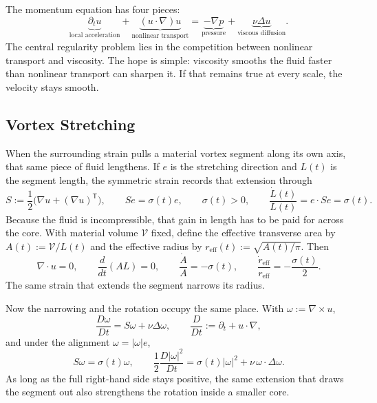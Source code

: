 
The momentum equation has four pieces:
\[
  \underbrace{\partial_t u}_{\text{local acceleration}}
  +
  \underbrace{(u\cdot\nabla)u}_{\text{nonlinear transport}}
  =
  \underbrace{-\nabla p}_{\text{pressure}}
  +
  \underbrace{\nu\Delta u}_{\text{viscous diffusion}}.
\]
The central regularity problem lies in the competition between nonlinear transport and viscosity.
The hope is simple: viscosity smooths the fluid faster than nonlinear transport can sharpen it.
If that remains true at every scale, the velocity stays smooth.

\subsection{Vortex Stretching}\label{sub:ThePerfectlyStretchingVortex}

When the surrounding strain pulls a material vortex segment along its own axis, that same piece of fluid lengthens. If \(e\) is the stretching direction and \(L(t)\) is the segment length, the symmetric strain records that extension through
\[
  S:=\frac12\bigl(\nabla u+(\nabla u)^{\mathsf T}\bigr),
  \qquad
  Se=\sigma(t)e,
  \qquad
  \sigma(t)>0,
  \qquad
  \frac{\dot L(t)}{L(t)}
  =
  e\cdot Se
  =
  \sigma(t).
\]
Because the fluid is incompressible, that gain in length has to be paid for across the core. With material volume \(\mathcal V\) fixed, define the effective transverse area by \(A(t):=\mathcal V/L(t)\) and the effective radius by \(r_{\mathrm{eff}}(t):=\sqrt{A(t)/\pi}\). Then
\[
  \nabla\cdot u=0,
  \qquad
  \frac{d}{dt}(A L)=0,
  \qquad
  \frac{\dot A}{A}=-\sigma(t),
  \qquad
  \frac{\dot r_{\mathrm{eff}}}{r_{\mathrm{eff}}}
  =
  -\frac{\sigma(t)}{2}.
\]
The same strain that extends the segment narrows its radius.

Now the narrowing and the rotation occupy the same place. With \(\omega:=\nabla\times u\),
\[
  \frac{D\omega}{Dt}
  =
  S\omega+\nu\Delta\omega,
  \qquad
  \frac{D}{Dt}
  :=
  \partial_t+u\cdot\nabla,
\]
and under the alignment \(\omega=|\omega|e\),
\[
  S\omega
  =
  \sigma(t)\omega,
  \qquad
  \frac12\frac{D|\omega|^2}{Dt}
  =
  \sigma(t)|\omega|^2
  +
  \nu\,\omega\cdot\Delta\omega.
\]
As long as the full right-hand side stays positive, the same extension that draws the segment out also strengthens the rotation inside a smaller core.

